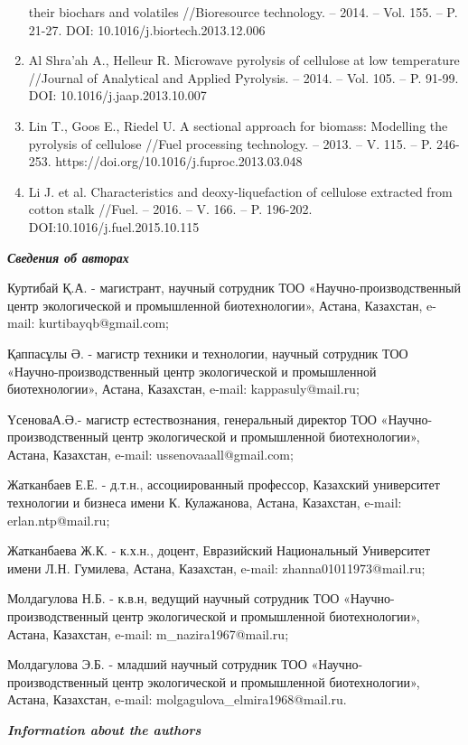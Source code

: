 \begin{enumerate}
  their biochars and volatiles //Bioresource technology. -- 2014. --
  Vol. 155. -- P. 21-27. DOI: 10.1016/j.biortech.2013.12.006
\item
  Al Shra'ah A., Helleur R. Microwave pyrolysis of cellulose at low
  temperature //Journal of Analytical and Applied Pyrolysis. -- 2014. --
  Vol. 105. -- P. 91-99. DOI: 10.1016/j.jaap.2013.10.007
\item
  Lin T., Goos E., Riedel U. A sectional approach for biomass: Modelling
  the pyrolysis of cellulose //Fuel processing technology. -- 2013. --
  V. 115. -- P. 246-253. https://doi.org/10.1016/j.fuproc.2013.03.048
\item
  Li J. et al. Characteristics and deoxy-liquefaction of cellulose
  extracted from cotton stalk //Fuel. -- 2016. -- V. 166. -- P. 196-202.
  DOI:10.1016/j.fuel.2015.10.115
\end{enumerate}

\emph{{\bfseries Сведения об авторах}}

Куртибай Қ.А. - магистрант, научный сотрудник ТОО
«Научно-производственный центр экологической и промышленной
биотехнологии», Астана, Казахстан, e-mail: kurtibayqb@gmail.com;

Қаппасұлы Ә. - магистр техники и технологии, научный сотрудник ТОО
«Научно-производственный центр экологической и промышленной
биотехнологии», Астана, Казахстан, e-mail: kappasuly@mail.ru;

ҮсеноваА.Ә.- магистр естествознания, генеральный директор ТОО
«Научно-производственный центр экологической и промышленной
биотехнологии», Астана, Казахстан, e-mail: ussenovaaall@gmail.com;

Жатканбаев Е.Е. - д.т.н., ассоциированный профессор, Казахский
университет технологии и бизнеса имени К. Кулажанова, Астана, Казахстан,
e-mail: erlan.ntp@mail.ru;

Жатканбаева Ж.К. - к.х.н., доцент, Евразийский Национальный Университет
имени Л.Н. Гумилева, Астана, Казахстан, e-mail: zhanna01011973@mail.ru;

Молдагулова Н.Б. - к.в.н, ведущий научный сотрудник ТОО
«Научно-производственный центр экологической и промышленной
биотехнологии», Астана, Казахстан, e-mail: m\_nazira1967@mail.ru;

Молдагулова Э.Б. - младший научный сотрудник ТОО
«Научно-производственный центр экологической и промышленной
биотехнологии», Астана, Казахстан, e-mail:
molgagulova\_elmira1968@mail.ru.

\emph{{\bfseries Information about the authors}}

